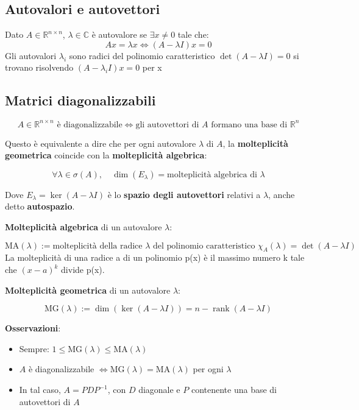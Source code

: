 \documentclass[12pt,a4paper]{article}
\begin{document}
\subsection*{Autovalori e autovettori}
Dato \( A \in \mathbb{R}^{n \times n} \), \( \lambda \in \mathbb{C} \) è autovalore se \( \exists x \ne 0 \) tale che:
\[ Ax = \lambda x \iff (A - \lambda I)x = 0 \]
Gli autovalori \( \lambda_i \) sono radici del polinomio caratteristico \( \det(A - \lambda I) = 0 \)
 si trovano risolvendo \( (A - \lambda_i I)x = 0 \) per x

\subsection*{Matrici diagonalizzabili}


\[
A \in \mathbb{R}^{n \times n} \text{ è diagonalizzabile} \iff \text{gli autovettori di } A \text{ formano una base di } \mathbb{R}^n
\]

Questo è equivalente a dire che per ogni autovalore \( \lambda \) di \( A \), la \textbf{molteplicità geometrica} coincide con la \textbf{molteplicità algebrica}:

\[
\forall \lambda \in \sigma(A), \quad \dim(E_\lambda) = \text{molteplicità algebrica di } \lambda
\]

Dove \( E_\lambda = \ker(A - \lambda I) \) è lo \textbf{spazio degli autovettori} relativi a \( \lambda \), anche detto \textbf{autospazio}.

\vspace{1em}

\textbf{Molteplicità algebrica} di un autovalore \( \lambda \):

\[
\text{MA}(\lambda) := \text{molteplicità della radice } \lambda \text{ del polinomio caratteristico } \chi_A(\lambda) = \det(A - \lambda I)
\]
La molteplicità di una radice a di un polinomio p(x)
 è il massimo numero k tale che $(x-a)^k$ divide p(x).

\textbf{Molteplicità geometrica} di un autovalore \( \lambda \):

\[
\text{MG}(\lambda) := \dim(\ker(A - \lambda I)) = n - \operatorname{rank}(A - \lambda I)
\]

\vspace{1em}

\textbf{Osservazioni}:
\begin{itemize}
  \item Sempre: \( 1 \le \text{MG}(\lambda) \le \text{MA}(\lambda) \)
  \item \( A \) è diagonalizzabile \( \iff \text{MG}(\lambda) = \text{MA}(\lambda) \) per ogni \( \lambda \)
  \item In tal caso, \( A = PDP^{-1} \), con \( D \) diagonale e \( P \) contenente una base di autovettori di \( A \)
\end{itemize}
\end{document}
